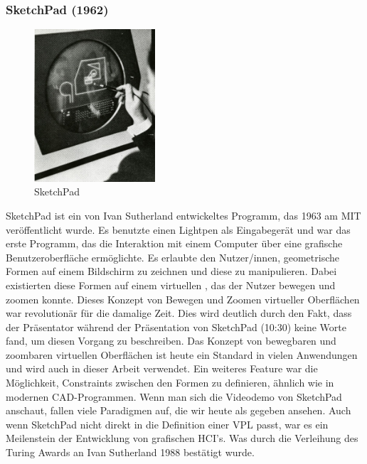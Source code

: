 \documentclass[ngerman]{article}
\begin{document}
\subsubsection{SketchPad (1962)}
\label{sec:SketchPad}
\begingroup
\setlength\intextsep{4pt}
\begin{minipage}{\linewidth}
\begin{figure}
  \centering
  \includegraphics[width=0.4\textwidth]{./graphics/sketchpad-sutherland.jpg} %
  \caption{SketchPad \cite{sutherlandSketchpad}}
\end{figure}
SketchPad ist ein von Ivan Sutherland entwickeltes Programm, das 1963 am MIT veröffentlicht wurde. 
Es benutzte einen Lightpen als Eingabegerät und war das erste Programm, das die Interaktion mit einem Computer über eine grafische Benutzeroberfläche ermöglichte. 
Es erlaubte den Nutzer/innen, geometrische Formen auf einem Bildschirm zu zeichnen und diese zu manipulieren.
  Dabei existierten diese Formen auf einem virtuellen , das der Nutzer bewegen und zoomen konnte. Dieses Konzept von Bewegen und Zoomen virtueller Oberflächen war revolutionär für die damalige Zeit.
  Dies wird deutlich durch den Fakt, dass der Präsentator während der Präsentation von SketchPad \cite{sketchpadDemo} (10:30) keine Worte fand, um diesen Vorgang zu beschreiben. Das Konzept von bewegbaren und zoombaren virtuellen Oberflächen ist heute ein Standard in vielen Anwendungen und wird auch in dieser Arbeit verwendet.
Ein weiteres Feature war die Möglichkeit, Constraints zwischen den Formen zu definieren, ähnlich wie in modernen CAD-Programmen. 
Wenn man sich die Videodemo von SketchPad anschaut, fallen viele Paradigmen auf, die wir heute als gegeben ansehen.
Auch wenn SketchPad nicht direkt in die Definition einer VPL passt, war es ein Meilenstein der Entwicklung von grafischen HCI's. Was durch die Verleihung des Turing Awards an Ivan Sutherland 1988 bestätigt wurde.
\end{minipage}
\endgroup
\end{document}
